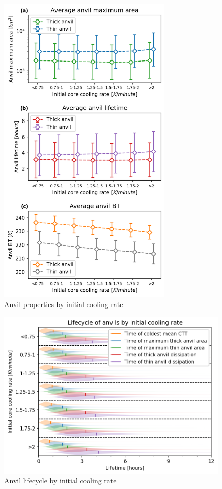 \begin{figure}[tp]
    \centering
    \includegraphics[width=0.75\textwidth]{figures/ch2_21.png}
    \caption{Anvil properties by initial cooling rate}
    \label{fig:anvil_cooling_rate_propeties}
\end{figure}

\begin{figure}[tp]
    \centering
    \includegraphics[width=\textwidth]{figures/ch2_22.png}
    \caption{Anvil lifecycle by initial cooling rate}
    \label{fig:anvil_cooling_rate_lifecycle}
\end{figure}

